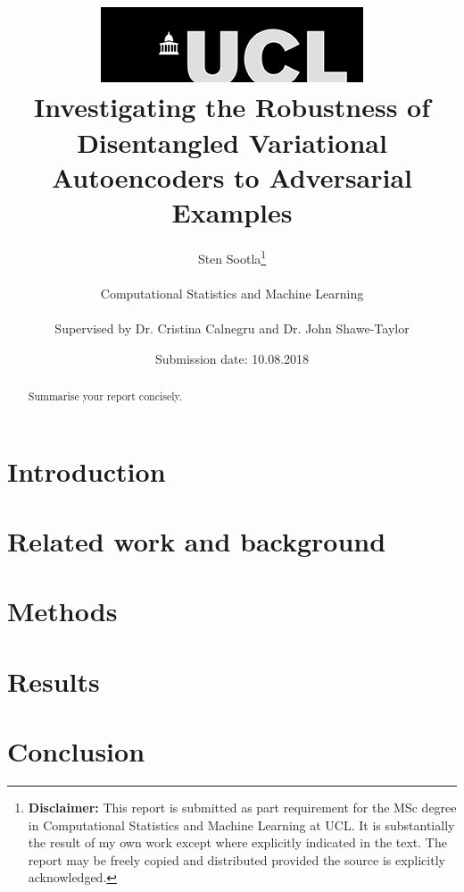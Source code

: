 \documentclass{report}
\title{  	{ \includegraphics[scale=.5]{ucl_logo.png}}\\
{{\Huge Investigating the Robustness of Disentangled Variational Autoencoders to Adversarial Examples}}\\}
\date{Submission date: 10.08.2018}
\author{Sten Sootla\thanks{
{\bf Disclaimer:}
This report is submitted as part requirement for the MSc degree in Computational Statistics and Machine Learning at UCL. It is substantially the result of my own work except where explicitly indicated in the text. The report may be freely copied and distributed provided the source is explicitly acknowledged.}
\\ \\
Computational Statistics and Machine Learning\\ \\
Supervised by Dr. Cristina Calnegru and Dr. John Shawe-Taylor
}
\begin{document}
 
 \onehalfspacing
\maketitle
\begin{abstract}
Summarise your report concisely.
\end{abstract}
\tableofcontents
\setcounter{page}{1}


\chapter{Introduction}

\chapter{Related work and background}

\chapter{Methods}

\chapter{Results}

\chapter{Conclusion}
\end{document}
